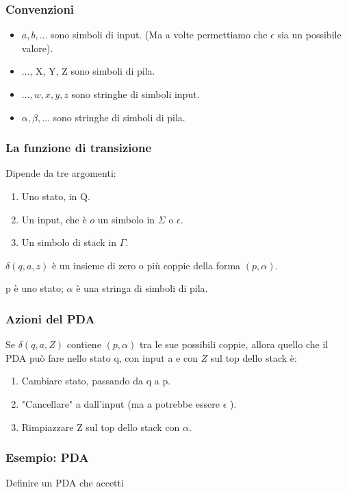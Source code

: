 \subsubsection{Convenzioni}
\begin{itemize}
    \item $a, b, \ldots$ sono simboli di input. (Ma a volte permettiamo che $\epsilon$ sia un possibile valore).
    \item $\ldots$, X, Y, Z sono simboli di pila.
    \item $\ldots, w, x, y, z$ sono stringhe di simboli input.
    \item $\alpha, \beta, \ldots$ sono stringhe di simboli di pila.
\end{itemize}

\subsubsection{La funzione di transizione}
Dipende da tre argomenti:
\begin{enumerate}
    \item Uno stato, in Q.
    \item  Un input, che è $o$ un simbolo in $\Sigma$ o $\epsilon$.
    \item Un simbolo di stack in $\Gamma$.
\end{enumerate}
$\delta(q, a, z)$ è un insieme di zero o più coppie della forma $(p, \alpha)$.

p è uno stato; $\alpha$ è una stringa di simboli di pila.

\subsubsection{Azioni del PDA}
Se $\delta(q, a, Z)$ contiene $(p, \alpha)$ tra le sue possibili coppie, allora quello che il PDA può fare nello stato $\mathrm{q}$, con input a $\mathrm{e}$ con $Z$ sul top dello stack è:
\begin{enumerate}
    \item  Cambiare stato, passando da q a p.
    \item "Cancellare" a dall'input (ma a potrebbe essere $\epsilon$ ).
    \item Rimpiazzare Z sul top dello stack con $\alpha$.
\end{enumerate}

\subsubsection{Esempio: PDA}
Definire un PDA che accetti

